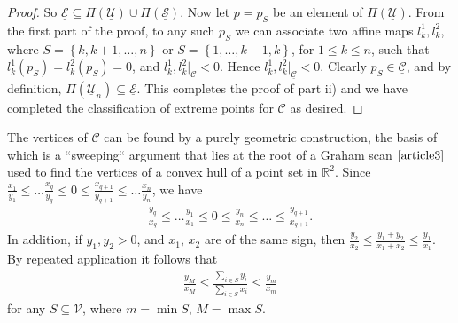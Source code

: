 \documentclass{article}
\theoremstyle{case}
\begin{document}
\begin{proof}
So $\underline{\mathcal{E}} \subseteq \Pi\left( \mathcal{\underline{U}}\right) \cup \Pi\left( \mathcal{\underline{S}}\right)$. Now let $p = p_S$ be an element of $\Pi\left( \mathcal{\underline{U}}\right)$. From the first part of the proof, to any such $p_S$ we can associate two affine maps $l_k^1, l_k^2$, where $S = \left\lbrace k, k+1, \dots, n\right\rbrace$ or $S = \left\lbrace 1, \dots, k-1, k\right\rbrace$, for $1 \leq k \leq n$, such that $l_k^1\left( p_S\right) = l_k^2\left( p_S\right) = 0$, and $l_k^1, l_k^2 \vert_{\mathcal{C}} < 0$. Hence $l_k^1, l_k^2 \vert_{\mathcal{\underline{C}}} < 0$. Clearly $p_S \in \underline{\mathcal{C}}$, and by definition, $ \Pi\left( \mathcal{\underline{U}}_n\right) \subseteq \underline{\mathcal{E}}$. This completes the proof of part ii) and we have completed the classification of extreme points for $\underline{\mathcal{C}}$ as desired.
\end{proof}

\vspace{6pt} 
The vertices of $\mathcal{C}$ can be found by a purely geometric construction, the basis of which is a ``sweeping`` argument that lies at the root of a Graham scan $\cite{article3}$ used to find the vertices of a convex hull of a point set in $\mathbb{R}^2$. Since $\frac{x_1}{y_1} \leq \dots \frac{x_q}{y_q} \leq 0 \leq \frac{x_{q+1}}{y_{q+1}} \leq \dots \frac{x_n}{y_n}$, we have 
\begin{align} \label{eq7}
\frac{y_q}{x_q} \leq \dots \frac{y_1}{x_1} \leq 0 \leq \frac{y_n}{x_n} \leq \dots \leq \frac{y_{q+1}}{x_{q+1}}.
\end{align} 
In addition, if $y_1, y_2 > 0$, and $x_1$, $x_2$ are of the same sign, then $\frac{y_2}{x_2} \leq \frac{y_1+y_2}{x_1+x_2} \leq \frac{y_1}{x_1}.$ By repeated application it follows that
\begin{align} \label{eq8}
\frac{y_M}{x_M} \leq \frac{\sum_{i \in S}y_i}{\sum_{i \in S}x_i} \leq \frac{y_m}{x_m}
\end{align}
for any $S \subseteq \mathcal{V}$, where $m = \min S$, $M = \max S$. 
\end{document}
